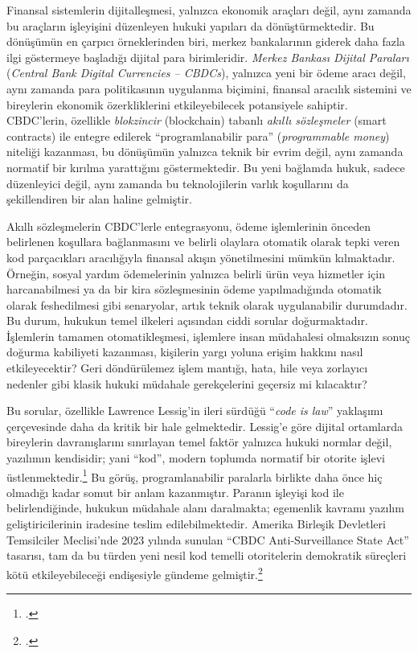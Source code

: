 \documentclass[a4paper,12pt]{article}
\begin{document}
Finansal sistemlerin dijitalleşmesi, yalnızca ekonomik araçları değil, aynı zamanda bu araçların işleyişini düzenleyen hukuki yapıları da dönüştürmektedir. Bu dönüşümün en çarpıcı örneklerinden biri, merkez bankalarının giderek daha fazla ilgi göstermeye başladığı dijital para birimleridir. \textit{Merkez Bankası Dijital Paraları} (\textit{Central Bank Digital Currencies – CBDCs}), yalnızca yeni bir ödeme aracı değil, aynı zamanda para politikasının uygulanma biçimini, finansal aracılık sistemini ve bireylerin ekonomik özerkliklerini etkileyebilecek potansiyele sahiptir. CBDC’lerin, özellikle \textit{blokzincir} (blockchain) tabanlı \textit{akıllı sözleşmeler} (smart contracts) ile entegre edilerek “programlanabilir para” (\textit{programmable money}) niteliği kazanması, bu dönüşümün yalnızca teknik bir evrim değil, aynı zamanda normatif bir kırılma yarattığını göstermektedir. Bu yeni bağlamda hukuk, sadece düzenleyici değil, aynı zamanda bu teknolojilerin varlık koşullarını da şekillendiren bir alan haline gelmiştir.

Akıllı sözleşmelerin CBDC’lerle entegrasyonu, ödeme işlemlerinin önceden belirlenen koşullara bağlanmasını ve belirli olaylara otomatik olarak tepki veren kod parçacıkları aracılığıyla finansal akışın yönetilmesini mümkün kılmaktadır. Örneğin, sosyal yardım ödemelerinin yalnızca belirli ürün veya hizmetler için harcanabilmesi ya da bir kira sözleşmesinin ödeme yapılmadığında otomatik olarak feshedilmesi gibi senaryolar, artık teknik olarak uygulanabilir durumdadır. Bu durum, hukukun temel ilkeleri açısından ciddi sorular doğurmaktadır. İşlemlerin tamamen otomatikleşmesi, işlemlere insan müdahalesi olmaksızın sonuç doğurma kabiliyeti kazanması, kişilerin yargı yoluna erişim hakkını nasıl etkileyecektir? Geri döndürülemez işlem mantığı, hata, hile veya zorlayıcı nedenler gibi klasik hukuki müdahale gerekçelerini geçersiz mi kılacaktır?  

Bu sorular, özellikle Lawrence Lessig’in ileri sürdüğü “\textit{code is law}” yaklaşımı çerçevesinde daha da kritik bir hale gelmektedir. Lessig’e göre dijital ortamlarda bireylerin davranışlarını sınırlayan temel faktör yalnızca hukuki normlar değil, yazılımın kendisidir; yani “kod”, modern toplumda normatif bir otorite işlevi üstlenmektedir.\footcite{lessig1999code} Bu görüş, programlanabilir paralarla birlikte daha önce hiç olmadığı kadar somut bir anlam kazanmıştır. Paranın işleyişi kod ile belirlendiğinde, hukukun müdahale alanı daralmakta; egemenlik kavramı yazılım geliştiricilerinin iradesine teslim edilebilmektedir. Amerika Birleşik Devletleri Temsilciler Meclisi’nde 2023 yılında sunulan “CBDC Anti-Surveillance State Act” tasarısı, tam da bu türden yeni nesil kod temelli otoritelerin demokratik süreçleri kötü etkileyebileceği endişesiyle gündeme gelmiştir.\footcite{emmer2023cbdc}  
\end{document}
